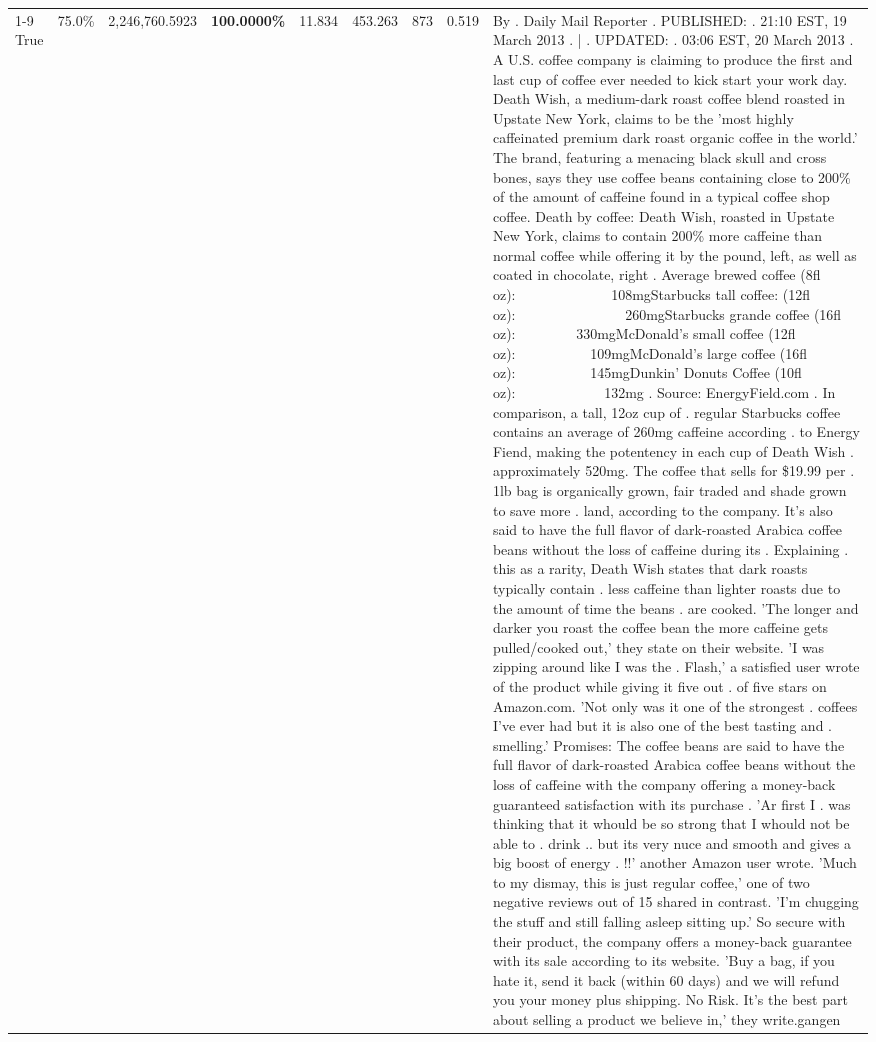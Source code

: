 \begin{table}[H]
{\begin{tabular}{lllrlllll}
\cline{1-9}
True & 75.0\% & 2,246,760.5923 & \bfseries \color{red} 100.0000\% & 11.834 & 453.263 & 873 & 0.519 & By . Daily Mail Reporter . PUBLISHED: . 21:10 EST, 19 March 2013 . | . UPDATED: . 03:06 EST, 20 March 2013 . A U.S. coffee company is claiming to produce the first and last cup of coffee ever needed to kick start your work day. Death Wish, a medium-dark roast coffee blend roasted in Upstate New York, claims to be the 'most highly caffeinated premium dark roast organic coffee in the world.' The brand, featuring a menacing black skull and cross bones, says they use coffee beans containing close to 200\% of the amount of caffeine found in a typical coffee shop coffee. Death by coffee: Death Wish, roasted in Upstate New York, claims to contain 200\% more caffeine than normal coffee while offering it by the pound, left, as well as coated in chocolate, right . Average brewed coffee (8fl oz):              108mgStarbucks tall coffee: (12fl oz):                260mgStarbucks grande coffee (16fl oz):         330mgMcDonald's small coffee (12fl oz):           109mgMcDonald's large coffee (16fl oz):           145mgDunkin' Donuts Coffee (10fl oz):             132mg . Source: EnergyField.com . In comparison, a tall, 12oz cup of . regular Starbucks coffee contains an average of 260mg caffeine according . to Energy Fiend, making the potentency in each cup of Death Wish . approximately 520mg. The coffee that sells for \$19.99 per . 1lb bag is organically grown, fair traded and shade grown to save more . land, according to the company. It's also said to have the full flavor of dark-roasted Arabica coffee beans without the loss of caffeine during its . Explaining . this as a rarity, Death Wish states that dark roasts typically contain . less caffeine than lighter roasts due to the amount of time the beans . are cooked. 'The longer and darker you roast the coffee bean the more caffeine gets pulled/cooked out,' they state on their website. 'I was zipping around like I was the . Flash,' a satisfied user wrote of the product while giving it five out . of five stars on Amazon.com. 'Not only was it one of the strongest . coffees I've ever had but it is also one of the best tasting and . smelling.’ Promises: The coffee beans are said to have the full flavor of dark-roasted Arabica coffee beans without the loss of caffeine with the company offering a money-back guaranteed satisfaction with its purchase . 'Ar first I . was thinking that it whould be so strong that I whould not be able to . drink .. but its very nuce and smooth and gives a big boost of energy . !!' another Amazon user wrote. 'Much to my dismay, this is just regular coffee,' one of two negative reviews out of 15 shared in contrast. 'I'm chugging the stuff and still falling asleep sitting up.' So secure with their product, the company offers a money-back guarantee with its sale according to its website. 'Buy a bag, if you hate it, send it back (within 60 days) and we will refund you your money plus shipping. No Risk. It’s the best part about selling a product we believe in,' they write.gangen \\

\end{tabular}}
\end{table}
